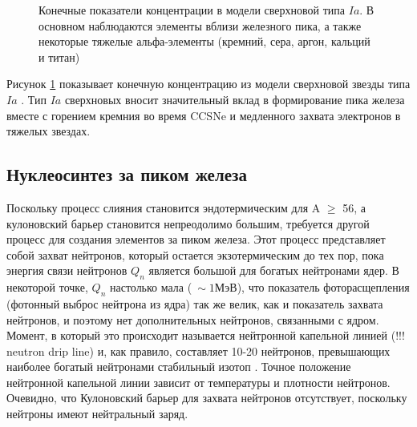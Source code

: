 \documentclass[%
master,    %
natbib,      %
subf,        %
href,        %
colorlinks,  %
]{disser}
\begin{document}
\begin{figure}[h]
	\caption{Конечные показатели концентрации в модели сверхновой типа $Ia$. В основном наблюдаются элементы вблизи железного пика, а также некоторые тяжелые альфа-элементы (кремний, сера, аргон, кальций и титан)}
	\label{ris:iron-abu}
\end{figure}

Рисунок \ref{ris:iron-abu} показывает конечную концентрацию из модели сверхновой звезды типа $Ia$ \cite{iron-abu}. Тип $Ia$ сверхновых вносит значительный вклад в формирование пика железа вместе с горением кремния во время CCSNe и медленного захвата электронов в тяжелых звездах.

\subsection{Нуклеосинтез за пиком железа}
Поскольку процесс слияния становится эндотермическим для A $\ge$ 56, а кулоновский барьер становится непреодолимо большим, требуется другой процесс для создания элементов за пиком железа. Этот процесс представляет собой захват нейтронов, который остается экзотермическим до тех пор, пока энергия связи нейтронов $Q_n$ является большой для богатых нейтронами ядер. В некоторой точке, $Q_n$ настолько мала ($~\sim1 \text{МэВ}$), что показатель фоторасщепления (фотонный выброс нейтрона из ядра) так же велик, как и показатель захвата нейтронов, и поэтому нет дополнительных нейтронов, связанными с ядром. Момент, в который это происходит называется нейтронной капельной линией (!!! neutron drip line) и, как правило, составляет 10-20 нейтронов, превышающих наиболее богатый нейтронами стабильный изотоп \cite{cauldrons}. Точное положение нейтронной капельной линии зависит от температуры и плотности нейтронов. Очевидно, что Кулоновский барьер  для захвата нейтронов отсутствует, поскольку нейтроны имеют нейтральный заряд.
\end{document}
